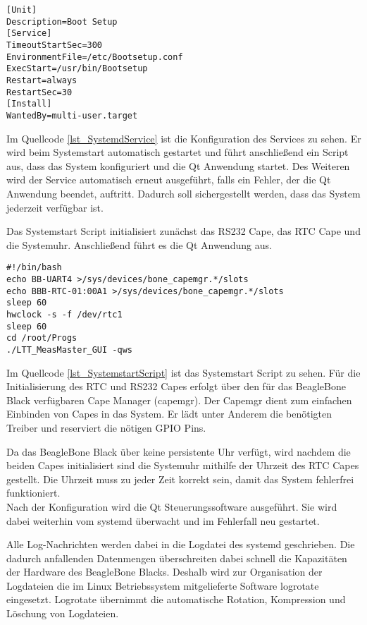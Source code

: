 \begin{lstlisting}[caption={Systemd Service},label=lst_SystemdService]
[Unit]
Description=Boot Setup
[Service]
TimeoutStartSec=300
EnvironmentFile=/etc/Bootsetup.conf
ExecStart=/usr/bin/Bootsetup
Restart=always
RestartSec=30
[Install]
WantedBy=multi-user.target
\end{lstlisting}

Im Quellcode \ref{lst_SystemdService} ist die Konfiguration des Services zu sehen. Er wird beim Systemstart automatisch gestartet und führt anschließend ein Script aus, dass das System konfiguriert und die Qt Anwendung startet. Des Weiteren wird der Service automatisch erneut ausgeführt, falls ein Fehler, der die Qt Anwendung beendet, auftritt. Dadurch soll sichergestellt werden, dass das System jederzeit verfügbar ist.\ 

Das Systemstart Script initialisiert zunächst das RS232 Cape, das \ac{RTC} Cape und die Systemuhr. Anschließend führt es die Qt Anwendung aus.\\ 

\begin{lstlisting}[caption={Systemstart Script},label=lst_SystemstartScript]
#!/bin/bash
echo BB-UART4 >/sys/devices/bone_capemgr.*/slots
echo BBB-RTC-01:00A1 >/sys/devices/bone_capemgr.*/slots
sleep 60
hwclock -s -f /dev/rtc1
sleep 60
cd /root/Progs
./LTT_MeasMaster_GUI -qws
\end{lstlisting}

Im Quellcode \ref{lst_SystemstartScript} ist das Systemstart Script zu sehen. Für die Initialisierung des RTC und RS232 Capes erfolgt über den für das BeagleBone Black verfügbaren Cape Manager (capemgr). Der Capemgr \cite{Capemgr} dient zum einfachen Einbinden von Capes in das System. Er lädt unter Anderem die benötigten Treiber und reserviert die nötigen \ac{GPIO} Pins.\ 

Da das BeagleBone Black über keine persistente Uhr verfügt, wird nachdem die beiden Capes initialisiert sind die Systemuhr mithilfe der Uhrzeit des RTC Capes gestellt. Die Uhrzeit muss zu jeder Zeit korrekt sein, damit das System fehlerfrei funktioniert.\\
Nach der Konfiguration wird die Qt Steuerungssoftware ausgeführt. Sie wird dabei weiterhin vom systemd überwacht und im Fehlerfall neu gestartet.\ 

Alle Log-Nachrichten werden dabei in die Logdatei des systemd geschrieben. Die dadurch anfallenden Datenmengen überschreiten dabei schnell die Kapazitäten der Hardware des BeagleBone Blacks. Deshalb wird zur Organisation der Logdateien die im Linux Betriebssystem mitgelieferte Software logrotate \cite{logrotate} eingesetzt. Logrotate übernimmt die automatische Rotation, Kompression und Löschung von Logdateien.\\

